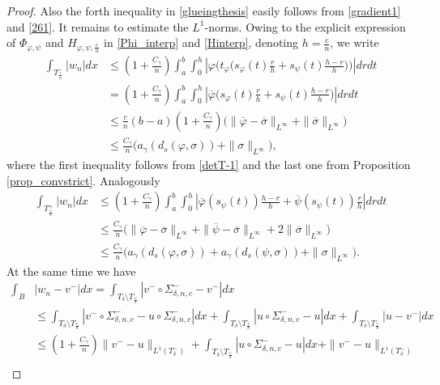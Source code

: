 \documentclass[10pt,a4paper]{amsart}
\begin{document}
\begin{proof}
Also  the forth inequality in \eqref{glueingthesis} easily follows from \eqref{gradient1} and \eqref{261}.
It remains to estimate the $L^1$-norms. Owing to the explicit expression of $\Phi_{\varphi,\psi}$ and $H_{\varphi,\psi,\frac cn}$ in \eqref{Phi_interp} and  \eqref{Hinterp}, denoting $h=\frac cn$, we write
\begin{align*}
\int_{T^-_{\frac{c}{n}}}|w_n|dx&\leq (1+\frac{C_\gamma}{n})\int_a^b\int_0^h|\varphi\Big(t_\varphi\big(s_\varphi(t)\frac{r}{h}+s_\psi(t)\frac{h-r}{h} \big)\Big)|drdt\\
&=(1+\frac{C_\gamma}{n})\int_a^b\int_0^h|\overline \varphi\big(s_\varphi(t)\frac{r}{h}+s_\psi(t)\frac{h-r}{h} \big)|drdt\\
&\leq \frac{c}{n}(b-a)(1+\frac{C_\gamma}{n})\big(\|\overline \varphi-\overline \sigma\|_{L^\infty}+\|\overline \sigma\|_{L^\infty}\big)\\
&\leq \frac{C_\gamma}{n} \big(a_\gamma(d_s(\varphi,\sigma))+\|\sigma\|_{L^\infty}\big),
\end{align*}
where the first inequality follows from \eqref{detT-1} and the last one from Proposition \ref{prop_convstrict}. Analogously
\begin{align*}
	\int_{T^+_{\frac{c}{n}}}|w_n|dx&\leq (1+\frac{C_\gamma}{n})\int_a^b\int_0^h|\overline \varphi(s_\psi(t))\frac{h-r}{h}+\overline \psi(s_\psi(t))\frac{r}{h}|drdt\\&
	\leq \frac{C_\gamma}{n}\big(\|\overline \varphi-\overline \sigma\|_{L^\infty}+\|\overline \psi-\overline \sigma\|_{L^\infty}+2\|\overline \sigma\|_{L^\infty}\big)\\
	&\leq \frac{C_\gamma}{n} \big(a_\gamma(d_s(\varphi,\sigma))+a_\gamma(d_s(\psi,\sigma))+\|\sigma\|_{L^\infty}\big).
\end{align*}
At the same time we have
\begin{align*}
\int_B&|w_n-v^-|dx=\int_{T_\delta\setminus T_{\frac cn}}|v^-\circ\Sigma_{\delta,n,c}^- -v^-|dx\\
&\leq  \int_{T_\delta\setminus T_{\frac cn}}|v^-\circ\Sigma_{\delta,n,c}^- -u\circ\Sigma_{\delta,n,c}^-|dx+\int_{T_\delta\setminus T_{\frac cn}}|u\circ\Sigma_{\delta,n,c}^--u|dx+\int_{T_\delta\setminus T_{\frac cn}}|u-v^-|dx\\
&\leq (1+\frac{C_\gamma}{n})\|v^--u\|_{L^1(T_\delta^-)}+\int_{T_\delta\setminus T_{\frac cn}}|u\circ\Sigma_{\delta,n,c}^--u|dx+\|v^--u\|_{L^1(T_\delta^-)}\\

\end{align*}
\end{proof}
\end{document}
